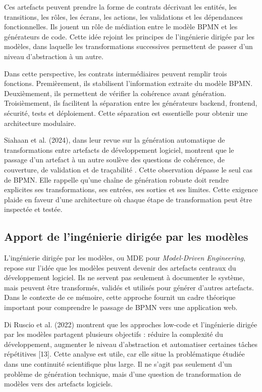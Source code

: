 Ces artefacts peuvent prendre la forme de contrats décrivant les entités, les transitions, les rôles, les écrans, les actions, les validations et les dépendances fonctionnelles. Ils jouent un rôle de médiation entre le modèle BPMN et les générateurs de code. Cette idée rejoint les principes de l'ingénierie dirigée par les modèles, dans laquelle les transformations successives permettent de passer d'un niveau d'abstraction à un autre.

Dans cette perspective, les contrats intermédiaires peuvent remplir trois fonctions. Premièrement, ils stabilisent l'information extraite du modèle BPMN. Deuxièmement, ils permettent de vérifier la cohérence avant génération. Troisièmement, ils facilitent la séparation entre les générateurs backend, frontend, sécurité, tests et déploiement. Cette séparation est essentielle pour obtenir une architecture modulaire.

Siahaan et al. (2024), dans leur revue sur la génération automatique de transformations entre artefacts de développement logiciel, montrent que le passage d'un artefact à un autre soulève des questions de cohérence, de couverture, de validation et de traçabilité \cite{siahaan2024}. Cette observation dépasse le seul cas de BPMN. Elle rappelle qu'une chaîne de génération robuste doit rendre explicites ses transformations, ses entrées, ses sorties et ses limites. Cette exigence plaide en faveur d'une architecture où chaque étape de transformation peut être inspectée et testée.


\subsection{Apport de l'ingénierie dirigée par les modèles}

L'ingénierie dirigée par les modèles, ou MDE pour \textit{Model-Driven Engineering}, repose sur l'idée que les modèles peuvent devenir des artefacts centraux du développement logiciel. Ils ne servent pas seulement à documenter le système, mais peuvent être transformés, validés et utilisés pour générer d'autres artefacts. Dans le contexte de ce mémoire, cette approche fournit un cadre théorique important pour comprendre le passage de BPMN vers une application web.

Di Ruscio et al. (2022) montrent que les approches low-code et l'ingénierie dirigée par les modèles partagent plusieurs objectifs : réduire la complexité du développement, augmenter le niveau d'abstraction et automatiser certaines tâches répétitives [13]. Cette analyse est utile, car elle situe la problématique étudiée dans une continuité scientifique plus large. Il ne s'agit pas seulement d'un problème de génération technique, mais d'une question de transformation de modèles vers des artefacts logiciels.

